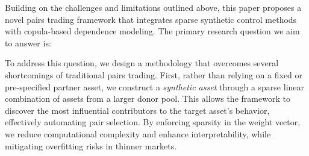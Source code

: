 %
%
%
%


Building on the challenges and limitations outlined above, this paper proposes a novel pairs trading framework that integrates sparse synthetic control methods with copula-based dependence modeling. 
%
The primary research question we aim to answer is: 

To address this question, we design a methodology that overcomes several shortcomings of traditional pairs trading. First, rather than relying on a fixed or pre-specified partner asset, we construct a \emph{synthetic asset} through a sparse linear combination of assets from a larger donor pool. This allows the framework to %
discover the most influential contributors to the target asset's behavior, effectively automating pair selection. By enforcing sparsity in the weight vector, we reduce computational complexity and enhance interpretability, while mitigating overfitting risks in thinner markets.

